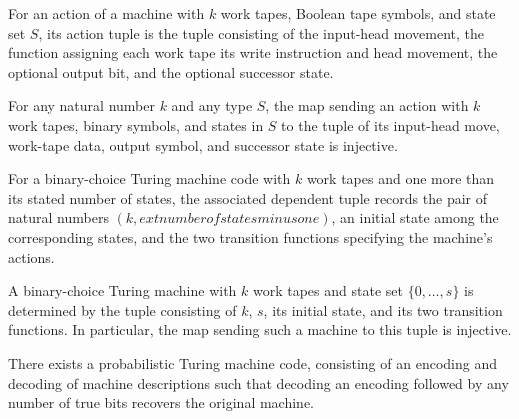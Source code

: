 \begin{definition}
\label{Turing.actionTuple}
\leanok
{}
For an action of a machine with $k$ work tapes, Boolean tape symbols, and state set $S$,
its action tuple is the tuple consisting of the input-head movement, the function
assigning each work tape its write instruction and head movement, the optional output
bit, and the optional successor state.
\end{definition}

\begin{theorem}
\label{Turing.actionTuple_injective}
\leanok
{}
For any natural number $k$ and any type $S$, the map sending an action with $k$ work
tapes, binary symbols, and states in $S$ to the tuple of its input-head move, work-tape
data, output symbol, and successor state is injective.
\end{theorem}

\begin{definition}
\label{Turing.codeSigma}
\leanok
{}
For a binary-choice Turing machine code with $k$ work tapes and one more than its stated
number of states, the associated dependent tuple records the pair of natural numbers
$(k,	ext{number of states minus one})$, an initial state among the corresponding states,
and the two transition functions specifying the machine's actions.
\end{definition}

\begin{theorem}
\label{Turing.codeSigma_injective}
\leanok
{}
A binary-choice Turing machine with $k$ work tapes and state set $\{0,\ldots,s\}$ is
determined by the tuple consisting of $k$, $s$, its initial state, and its two
transition functions. In particular, the map sending such a machine to this tuple is
injective.
\end{theorem}

\begin{theorem}
\label{Turing.PTMCode.nonempty}
\leanok
{}
There exists a probabilistic Turing machine code, consisting of an encoding and decoding
of machine descriptions such that decoding an encoding followed by any number of true
bits recovers the original machine.
\end{theorem}

